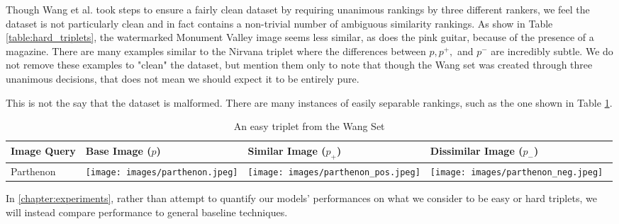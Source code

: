 Though Wang et al. took steps to ensure a fairly clean dataset by requiring unanimous rankings by three different rankers, we feel the dataset is not particularly clean and in fact contains a non-trivial number of ambiguous similarity rankings. As show in Table \ref{table:hard_triplets}, the watermarked Monument Valley image seems less similar, as does the pink guitar, because of the presence of a magazine. There are many examples similar to the Nirvana triplet where the differences between $p, p^+,$ and $p^-$ are incredibly subtle. We do not remove these examples to "clean" the dataset, but mention them only to note that though the Wang set was created through three unanimous decisions, that does not mean we should expect it to be entirely pure.

This is not the say that the dataset is malformed. There are many instances of easily separable rankings, such as the one shown in Table \ref{table:easy_triplet}.
\begin{table}
	\begin{tabular}{>{\centering\arraybackslash}m{1in} >{\centering\arraybackslash}m{1.4in} >{\centering\arraybackslash}m{1.4in} >{\centering\arraybackslash}m{1.4in}}
		\toprule
		\bfseries Image Query & \bfseries Base Image ($p$) & \bfseries Similar Image ($p_+$) & \bfseries Dissimilar Image ($p_-$) \\
		\midrule
		\centering Parthenon & \texttt{[image: images/parthenon.jpeg]} & \texttt{[image: images/parthenon\_pos.jpeg]} & \texttt{[image: images/parthenon\_neg.jpeg]}\
	\end{tabular}
	\caption{An easy triplet from the Wang Set}
	\label{table:easy_triplet}
\end{table}

In \ref{chapter:experiments}, rather than attempt to quantify our models' performances on what we consider to be easy or hard triplets, we will instead compare performance to general baseline techniques.

